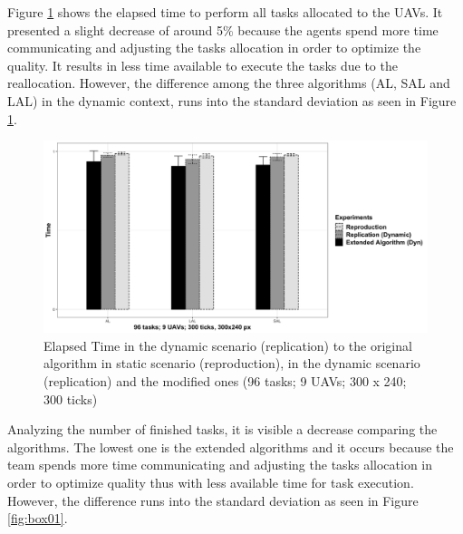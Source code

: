  Figure \ref{fig:din02} shows the elapsed time to perform all tasks allocated to the UAVs. It presented a slight decrease of around 5\% because the agents spend more time communicating and adjusting the tasks allocation in order to optimize the quality. It results in less time available to execute the tasks due to the reallocation. However, the difference among the three algorithms (AL, SAL and LAL) in the dynamic context, runs into the standard deviation as seen in Figure \ref{fig:din02}.
 
\begin{figure}[h!]
	\begin{center}
		\includegraphics[scale=0.15]{fig/GRAPH08.png}
		\caption{Elapsed Time  in the dynamic scenario (replication) to the original algorithm in static scenario (reproduction), in the dynamic scenario (replication) and the modified ones (96 tasks; 9 UAVs; 300 x 240; 300 ticks)}
		\label{fig:din02}
	\end{center}
\end{figure}

Analyzing the number of finished tasks, it is visible a decrease comparing the algorithms. The lowest one is the extended algorithms and it occurs because the team spends more time communicating and adjusting the tasks allocation in order to optimize quality thus with less available time for task execution. However, the difference runs into the standard deviation as seen in Figure \ref{fig:box01}.

